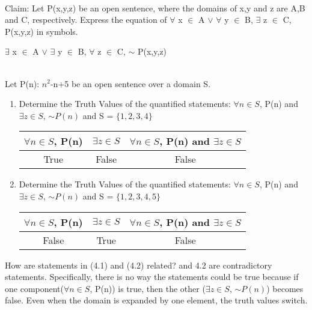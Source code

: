 \documentclass[12pt]{article}
\newenvironment{problem}[2][Problem]{\begin{trivlist}
\item[\hskip \labelsep {\bfseries #1}\hskip \labelsep {\bfseries #2.}]}{\end{trivlist}}
\begin{document}
\begin{problem}{3}
\text{ }\\
Claim: Let P(x,y,z) be an open sentence, where the domains of x,y and z are A,B and C, respectively. Express the equation of $\forall$ x $\in$ A $\vee$ $\forall$ y $\in$ B, $\exists$ z $\in$ C, P(x,y,z) in symbols.
\end{problem}
 
$\exists$ x $\in$ A $\lor$ $\exists$ y $\in$ B, $\forall$ z $\in$ C, $\sim$ P(x,y,z)

\begin{problem}{4}
\text{ }\\
Let P(n): $n^2$-n+5 be an open sentence over a domain S. 
\end{problem}
\begin{enumerate}
\item Determine the Truth Values of the quantified statements: $\forall n \in S$, P(n) and $\exists z \in S$, $\sim P(n)$ and S = $\{1,2,3,4\}$
\begin{center}
\begin{tabular}{|c|c|c|}
\hline
$\forall n \in S$, P(n) & $\exists z \in S$ & $\forall n \in S$, P(n) and $\exists z \in S$\\
\hline True & False & False\\
\end{tabular}
\end{center}
\item Determine the Truth Values of the quantified statements: $\forall n \in S$, P(n) and $\exists z \in S$, $\sim P(n)$ and S = $\{1,2,3,4,5\}$ \newline
\begin{center}
\begin{tabular}{|c|c|c|}
\hline
$\forall n \in S$, P(n) & $\exists z \in S$ & $\forall n \in S$, P(n) and $\exists z \in S$\\
\hline False & True & False\\
\end{tabular}
\end{center}


\end{enumerate}
How are statements in (4.1) and (4.2) related? \newline {} and 4.2 are contradictory statements. Specifically, there is no way the statements could be true because if one component($\forall n \in S$, P(n)) is true, then the other ($\exists z \in S$, $\sim P(n)$) becomes false. Even when the domain is expanded by one element, the truth values switch.  
\end{document}
